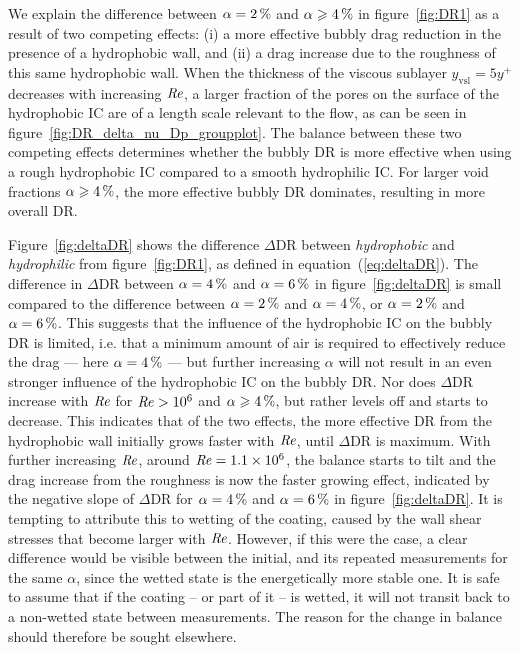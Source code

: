We explain the difference between $\alpha = \SI{2}{\percent}$ and $\alpha \geqslant \SI{4}{\percent}$ in figure~\ref{fig:DR1} as a result of two competing effects: (i) a more effective bubbly drag reduction in the presence of a {hydrophobic} wall, and (ii) a drag increase due to the roughness of this same {hydrophobic} wall. When the thickness of the viscous sublayer $y_\text{vsl} = 5y^+$ decreases with increasing $\mbox{\textit{Re}}$, a larger fraction of the pores on the surface of the {hydrophobic} IC are of a length scale relevant to the flow, as can be seen in figure~\ref{fig:DR_delta_nu_Dp_groupplot}. The balance between these two competing effects determines whether the bubbly DR is more effective when using a rough {hydrophobic} IC compared to a smooth hydrophilic IC. For larger void fractions $\alpha \geqslant \SI{4}{\percent}$, the more effective bubbly DR dominates, resulting in more overall DR.

Figure~\ref{fig:deltaDR} shows the difference $\Delta \text{DR}$ between \textit{hydrophobic} and \textit{hydrophilic} from figure~\ref{fig:DR1}, as defined in equation~(\ref{eq:deltaDR}). The difference in $\Delta \text{DR}$ between $\alpha = \SI{4}{\percent}$ and $\alpha = \SI{6}{\percent}$ in figure~\ref{fig:deltaDR} is small compared to the difference between $\alpha = \SI{2}{\percent}$ and $\alpha = \SI{4}{\percent}$, or $\alpha = \SI{2}{\percent}$ and $\alpha = \SI{6}{\percent}$. This suggests that the influence of the {hydrophobic} IC on the bubbly DR is limited, i.e. that a minimum amount of air is required to effectively reduce the drag --- here $\alpha = \SI{4}{\percent}$ --- but further increasing $\alpha$ will not result in an even stronger influence of the {hydrophobic} IC on the bubbly DR. Nor does $\Delta \text{DR}$ increase with $\mbox{\textit{Re}}$ for $\mbox{\textit{Re}} > 10^6$ and $\alpha \geqslant \SI{4}{\percent}$, but rather levels off and starts to decrease. This indicates that of the two effects, the more effective DR from the {hydrophobic} wall initially grows faster with $\mbox{\textit{Re}}$, until $\Delta \text{DR}$ is maximum. With further increasing $\mbox{\textit{Re}}$, around $\mbox{\textit{Re}} = 1.1 \times 10^6$, the balance starts to tilt and the drag increase from the roughness is now the faster growing effect, indicated by the negative slope of $\Delta \text{DR}$ for $\alpha = \SI{4}{\percent}$ and $\alpha = \SI{6}{\percent}$ in figure~\ref{fig:deltaDR}. It is tempting to attribute this to wetting of the coating, caused by the wall shear stresses that become larger with $\mbox{\textit{Re}}$. However, if this were the case, a clear difference would be visible between the initial, and its repeated measurements for the same $\alpha$, since the wetted state is the energetically more stable one. It is safe to assume that if the coating -- or part of it -- is wetted, it will not transit back to a non-wetted state between measurements. The reason for the change in balance should therefore be sought elsewhere.

